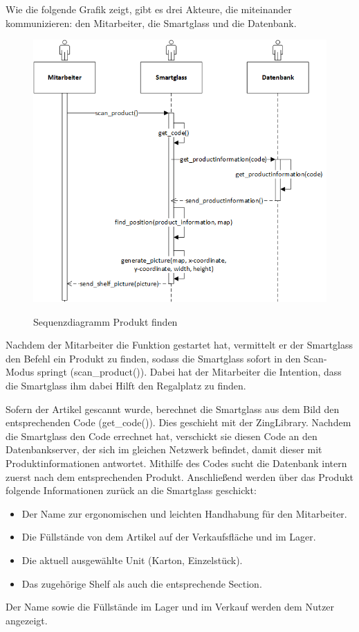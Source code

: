 Wie die folgende Grafik zeigt, gibt es drei Akteure, die miteinander kommunizieren: den Mitarbeiter, die Smartglass und die Datenbank.
\begin{figure}[H]
	\centering
	{\includegraphics[scale=0.8]{Bilder/Abbildungen/SMAR_produkt_finden_Sequenzdiagramm.png}}
	\caption{Sequenzdiagramm Produkt finden}
	\label{fig:jwt_encode}
\end{figure}
Nachdem der Mitarbeiter die Funktion gestartet hat, vermittelt er der Smartglass den Befehl ein Produkt zu finden, sodass die Smartglass sofort in den Scan-Modus springt (scan\_product()). Dabei hat der Mitarbeiter die Intention, dass die Smartglass ihm dabei Hilft den Regalplatz zu finden.

Sofern der Artikel gescannt wurde, berechnet die Smartglass aus dem Bild den entsprechenden Code (get\_code()). Dies geschieht mit der ZingLibrary. Nachdem die Smartglass den Code errechnet hat, verschickt sie diesen Code an den Datenbankserver, der sich im gleichen Netzwerk befindet, damit dieser mit Produktinformationen antwortet. Mithilfe des Codes sucht die Datenbank intern zuerst nach dem entsprechenden Produkt. Anschließend werden über das Produkt folgende Informationen zurück an die Smartglass geschickt:
\begin{itemize}
	\item Der Name zur ergonomischen und leichten Handhabung für den Mitarbeiter.
	\item Die Füllstände von dem Artikel auf der Verkaufsfläche und im  Lager.
	\item Die aktuell ausgewählte Unit (Karton, Einzelstück).
	\item Das zugehörige Shelf als auch die entsprechende Section.
\end{itemize}
Der Name sowie die Füllstände im Lager und im Verkauf werden dem Nutzer angezeigt.

